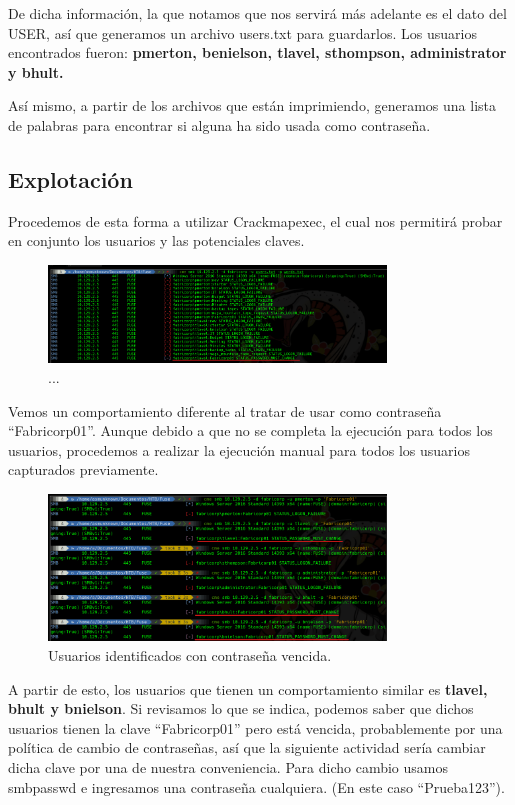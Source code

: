 \documentclass{article}
\begin{document}
De dicha información, la que notamos que nos servirá más adelante es el dato del USER, así que generamos un archivo users.txt para guardarlos. Los usuarios encontrados fueron: \textbf{pmerton, benielson, tlavel, sthompson, administrator y bhult.}

Así mismo, a partir de los archivos que están imprimiendo, generamos una lista de palabras para encontrar si alguna ha sido usada como contraseña.

\vfill
\vfill

\subsection{Explotación}

Procedemos de esta forma a utilizar Crackmapexec, el cual nos permitirá probar en conjunto los usuarios y las potenciales claves.

\begin{figure}[h]
	\center
	\includegraphics[width=0.8\textwidth]{images/fuse/image7.png}
	\caption{...}
\end{figure}

Vemos un comportamiento diferente al tratar de usar como contraseña “Fabricorp01”. Aunque debido a que no se completa la ejecución para todos los usuarios, procedemos a realizar la ejecución manual para todos los usuarios capturados previamente.

\clearpage 


\begin{figure}[h]
	\center
	\includegraphics[width=0.8\textwidth]{images/fuse/image8.png}
	\caption{Usuarios identificados con contraseña vencida.}
\end{figure}
\vfill
A partir de esto, los usuarios que tienen un comportamiento similar es \textbf{tlavel, bhult y bnielson}. Si revisamos lo que se indica, podemos saber que dichos usuarios tienen la clave “Fabricorp01” pero está vencida, probablemente por una política de cambio de contraseñas, así que la siguiente actividad sería cambiar dicha clave por una de nuestra conveniencia.
Para dicho cambio usamos smbpasswd e ingresamos una contraseña cualquiera. (En este caso “Prueba123”).
\end{document}
